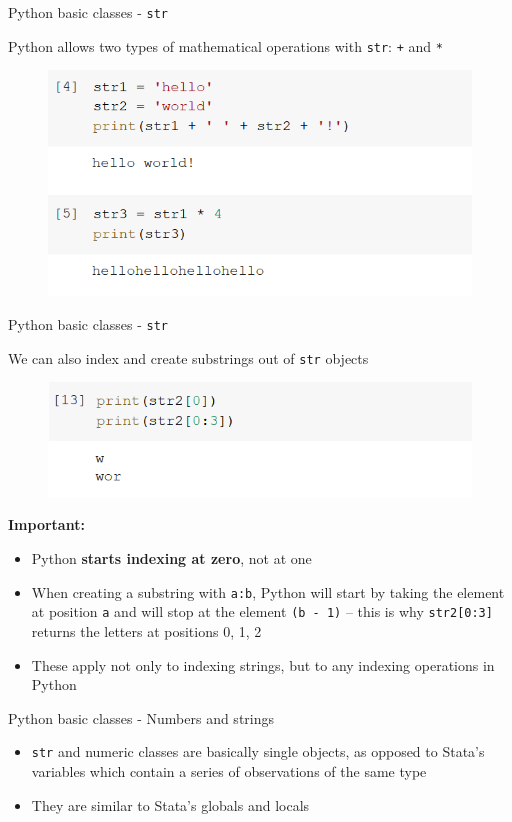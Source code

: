 \documentclass[aspectratio=169]{beamer}
\begin{document}
\begin{frame}{Python basic classes - \texttt{str}}

	Python allows two types of mathematical operations with \texttt{str}: \texttt{+} and \texttt{*}

	\begin{figure}
		\centering
		\includegraphics[width=0.6\linewidth]{img/string_operations.png}
	\end{figure}

\end{frame}

\begin{frame}{Python basic classes - \texttt{str}}

	We can also index and create substrings out of \texttt{str} objects

	\begin{figure}
		\centering
		\includegraphics[width=0.6\linewidth]{img/string_indexing.png}
	\end{figure}

	\textbf{Important:}

	\begin{itemize}
		\item Python \textbf{starts indexing at zero}, not at one
		\item When creating a substring with \texttt{a:b}, Python will start by taking the element at position \texttt{a} and will stop at the element \texttt{(b - 1)} -- this is why \texttt{str2[0:3]} returns the letters at positions 0, 1, 2
		\item These apply not only to indexing strings, but to any indexing operations in Python  
	\end{itemize}

\end{frame}

\begin{frame}{Python basic classes - Numbers and strings}

	\begin{itemize}
		\item \texttt{str} and numeric classes are basically single objects, as opposed to Stata's variables which contain a series of observations of the same type
		\item They are similar to Stata's globals and locals
	\end{itemize}

\end{frame}
\end{document}
